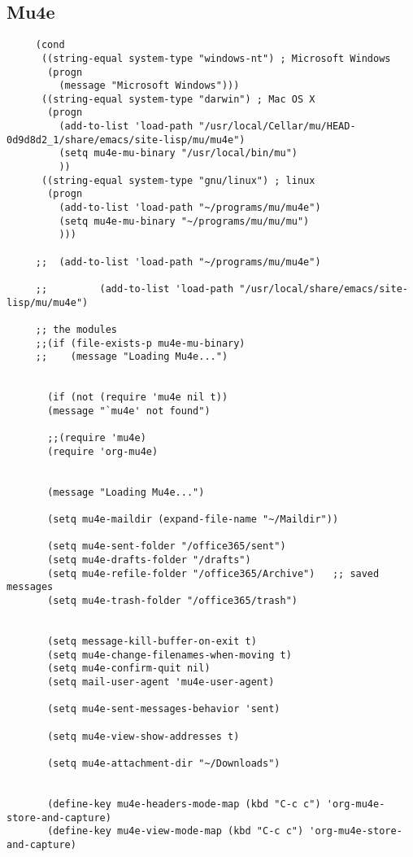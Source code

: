 \documentclass[12pt]{article}
\begin{document}
\subsection{Mu4e}
\label{sec-8-1}

\lstset{language=Lisp,label= ,caption= ,numbers=none}
\begin{lstlisting}
     (cond
      ((string-equal system-type "windows-nt") ; Microsoft Windows
       (progn
         (message "Microsoft Windows")))
      ((string-equal system-type "darwin") ; Mac OS X
       (progn
         (add-to-list 'load-path "/usr/local/Cellar/mu/HEAD-0d9d8d2_1/share/emacs/site-lisp/mu/mu4e")
         (setq mu4e-mu-binary "/usr/local/bin/mu")
         ))
      ((string-equal system-type "gnu/linux") ; linux
       (progn
         (add-to-list 'load-path "~/programs/mu/mu4e")
         (setq mu4e-mu-binary "~/programs/mu/mu/mu")
         )))

     ;;  (add-to-list 'load-path "~/programs/mu/mu4e")

     ;;         (add-to-list 'load-path "/usr/local/share/emacs/site-lisp/mu/mu4e")   

     ;; the modules
     ;;(if (file-exists-p mu4e-mu-binary)
     ;;    (message "Loading Mu4e...")


       (if (not (require 'mu4e nil t))
       (message "`mu4e' not found")

       ;;(require 'mu4e)
       (require 'org-mu4e)


       (message "Loading Mu4e...")

       (setq mu4e-maildir (expand-file-name "~/Maildir"))

       (setq mu4e-sent-folder "/office365/sent")
       (setq mu4e-drafts-folder "/drafts")
       (setq mu4e-refile-folder "/office365/Archive")   ;; saved messages
       (setq mu4e-trash-folder "/office365/trash")


       (setq message-kill-buffer-on-exit t)
       (setq mu4e-change-filenames-when-moving t)
       (setq mu4e-confirm-quit nil)
       (setq mail-user-agent 'mu4e-user-agent)

       (setq mu4e-sent-messages-behavior 'sent)

       (setq mu4e-view-show-addresses t)

       (setq mu4e-attachment-dir "~/Downloads")


       (define-key mu4e-headers-mode-map (kbd "C-c c") 'org-mu4e-store-and-capture)
       (define-key mu4e-view-mode-map (kbd "C-c c") 'org-mu4e-store-and-capture)


\end{lstlisting}
\end{document}
